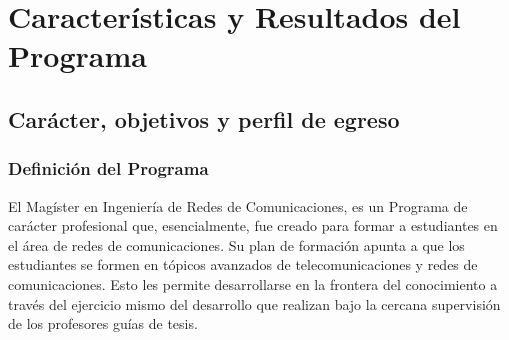 


\section{Características y Resultados del Programa}

\subsection{Carácter, objetivos y perfil de egreso}

\subsubsection{Definición del Programa}

El Magíster en Ingeniería de Redes de Comunicaciones, es un Programa de carácter profesional que, esencialmente, 
fue creado para formar a estudiantes en el área de redes de comunicaciones. 
Su plan de formación apunta a que los estudiantes se formen en tópicos
avanzados de telecomunicaciones y redes de comunicaciones. Esto les permite desarrollarse en la frontera del conocimiento
a través del ejercicio mismo del desarrollo que realizan bajo la cercana supervisión de los
profesores guías de tesis.

